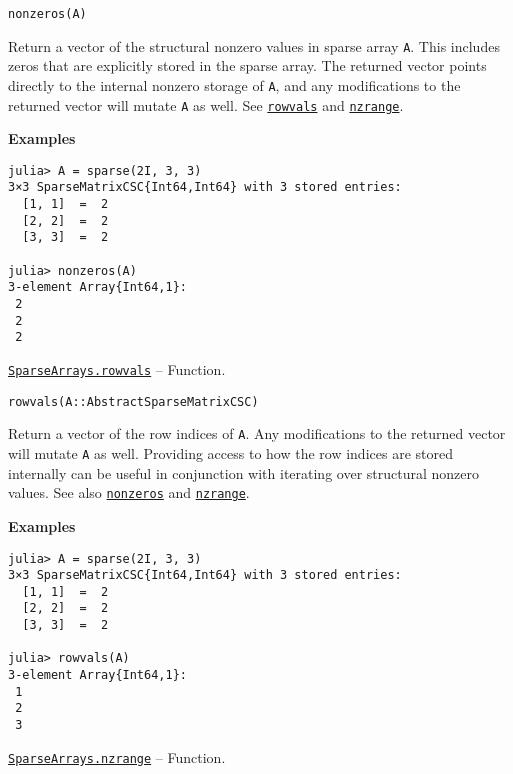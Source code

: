 \begin{adjustwidth}{2em}{0pt}


\begin{verbatim}
nonzeros(A)
\end{verbatim}

Return a vector of the structural nonzero values in sparse array \texttt{A}. This includes zeros that are explicitly stored in the sparse array. The returned vector points directly to the internal nonzero storage of \texttt{A}, and any modifications to the returned vector will mutate \texttt{A} as well. See \hyperlink{11529930160190690800}{\texttt{rowvals}} and \hyperlink{4192027552568489301}{\texttt{nzrange}}.

\textbf{Examples}


\begin{verbatim}
julia> A = sparse(2I, 3, 3)
3×3 SparseMatrixCSC{Int64,Int64} with 3 stored entries:
  [1, 1]  =  2
  [2, 2]  =  2
  [3, 3]  =  2

julia> nonzeros(A)
3-element Array{Int64,1}:
 2
 2
 2
\end{verbatim}



\end{adjustwidth}
\hypertarget{11529930160190690800}{} 
\hyperlink{11529930160190690800}{\texttt{SparseArrays.rowvals}}  -- {Function.}

\begin{adjustwidth}{2em}{0pt}


\begin{verbatim}
rowvals(A::AbstractSparseMatrixCSC)
\end{verbatim}

Return a vector of the row indices of \texttt{A}. Any modifications to the returned vector will mutate \texttt{A} as well. Providing access to how the row indices are stored internally can be useful in conjunction with iterating over structural nonzero values. See also \hyperlink{2553509978651134823}{\texttt{nonzeros}} and \hyperlink{4192027552568489301}{\texttt{nzrange}}.

\textbf{Examples}


\begin{verbatim}
julia> A = sparse(2I, 3, 3)
3×3 SparseMatrixCSC{Int64,Int64} with 3 stored entries:
  [1, 1]  =  2
  [2, 2]  =  2
  [3, 3]  =  2

julia> rowvals(A)
3-element Array{Int64,1}:
 1
 2
 3
\end{verbatim}



\end{adjustwidth}
\hypertarget{4192027552568489301}{} 
\hyperlink{4192027552568489301}{\texttt{SparseArrays.nzrange}}  -- {Function.}

